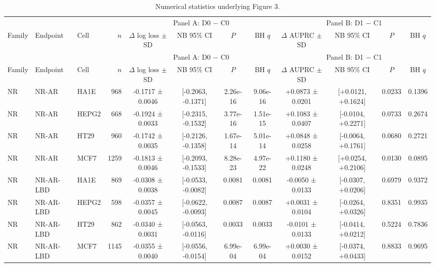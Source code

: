 \begin{landscape}
\scriptsize
\setlength{\tabcolsep}{2.7pt}
\renewcommand{\arraystretch}{1.12}
\begin{longtable}{lll r cc cc cc cc}
\caption{Numerical statistics underlying Figure 3.}\label{tab:s8_figure3_statistics}\\
\toprule
& & & & \multicolumn{4}{c}{Panel A: D0 $-$ C0} & \multicolumn{4}{c}{Panel B: D1 $-$ C1} \\
\cmidrule(lr){5-8}\cmidrule(lr){9-12}
Family & Endpoint & Cell & $n$ & $\Delta$ log loss $\pm$ SD & NB 95\% CI & $P$ & BH $q$ & $\Delta$ AUPRC $\pm$ SD & NB 95\% CI & $P$ & BH $q$ \\
\midrule
\endfirsthead
\toprule
& & & & \multicolumn{4}{c}{Panel A: D0 $-$ C0} & \multicolumn{4}{c}{Panel B: D1 $-$ C1} \\
\cmidrule(lr){5-8}\cmidrule(lr){9-12}
Family & Endpoint & Cell & $n$ & $\Delta$ log loss $\pm$ SD & NB 95\% CI & $P$ & BH $q$ & $\Delta$ AUPRC $\pm$ SD & NB 95\% CI & $P$ & BH $q$ \\
\midrule
\endhead
NR & NR-AR & HA1E & 968 & -0.1717 ± 0.0046 & [-0.2063, -0.1371] & 2.26e-16 & 9.06e-16 & +0.0873 ± 0.0201 & [+0.0121, +0.1624] & 0.0233 & 0.1396 \\
NR & NR-AR & HEPG2 & 668 & -0.1924 ± 0.0033 & [-0.2315, -0.1532] & 3.77e-16 & 1.51e-15 & +0.1083 ± 0.0407 & [-0.0104, +0.2271] & 0.0733 & 0.2674 \\
NR & NR-AR & HT29 & 960 & -0.1742 ± 0.0035 & [-0.2126, -0.1358] & 1.67e-14 & 5.01e-14 & +0.0848 ± 0.0258 & [-0.0064, +0.1761] & 0.0680 & 0.2721 \\
NR & NR-AR & MCF7 & 1259 & -0.1813 ± 0.0046 & [-0.2093, -0.1533] & 8.28e-23 & 4.97e-22 & +0.1180 ± 0.0248 & [+0.0254, +0.2106] & 0.0130 & 0.0895 \\
\addlinespace[1.5pt]
NR & NR-AR-LBD & HA1E & 869 & -0.0308 ± 0.0038 & [-0.0533, -0.0082] & 0.0081 & 0.0081 & -0.0050 ± 0.0133 & [-0.0307, +0.0206] & 0.6979 & 0.9372 \\
NR & NR-AR-LBD & HEPG2 & 598 & -0.0357 ± 0.0045 & [-0.0622, -0.0093] & 0.0087 & 0.0087 & +0.0031 ± 0.0104 & [-0.0264, +0.0326] & 0.8351 & 0.9935 \\
NR & NR-AR-LBD & HT29 & 862 & -0.0340 ± 0.0031 & [-0.0563, -0.0116] & 0.0033 & 0.0033 & -0.0101 ± 0.0133 & [-0.0414, +0.0212] & 0.5224 & 0.7836 \\
NR & NR-AR-LBD & MCF7 & 1145 & -0.0355 ± 0.0040 & [-0.0556, -0.0154] & 6.99e-04 & 6.99e-04 & +0.0030 ± 0.0152 & [-0.0374, +0.0433] & 0.8833 & 0.9695 \\

\end{longtable}
\end{landscape}
